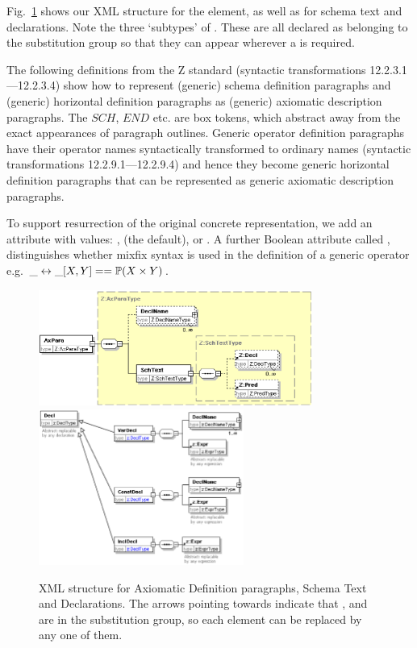 \documentclass{llncs}  %
\begin{document}
Fig.~\ref{fig:axpara} shows our XML structure for the 
element, as well as for schema text and declarations.  Note the
three `subtypes' of .  These are all declared as belonging to
the  substitution group so that they can appear wherever
a  is required.

The following definitions from the Z standard
(syntactic transformations 12.2.3.1---12.2.3.4)
show how to represent (generic) schema definition paragraphs
and (generic) horizontal definition paragraphs
as (generic) axiomatic description paragraphs.  The $SCH$, $END$ {etc.} are
box tokens, which abstract away from the exact appearances of paragraph
outlines. 
\DTschemadef
\DTgenschemadef
\DThorizdef
\DTgenhorizdef
Generic operator definition paragraphs have their operator names
syntactically transformed to ordinary names
(syntactic transformations 12.2.9.1---12.2.9.4)
and hence they become generic horizontal definition paragraphs
that can be represented as generic axiomatic description paragraphs.

To support resurrection of the original concrete representation, we add an
attribute  with values: ,  (the
default), or .  A further Boolean attribute called
, distinguishes whether mixfix syntax is used in the 
definition of a generic operator
e.g. $\_ \rel \_ [X,Y] == \power(X \cross Y)$.

\begin{figure}[!htbp]
  \centering
  \includegraphics[width=0.8\textwidth]{axpara.eps}
  \includegraphics[width=0.6\textwidth]{decls.eps}
  \caption{XML structure for Axiomatic Definition paragraphs, Schema Text
  and Declarations.  The arrows pointing towards  indicate that
  ,  and  are in the
   substitution group, so each  element can be
  replaced by any one of them.}
  \label{fig:axpara}
\end{figure}
\end{document}
